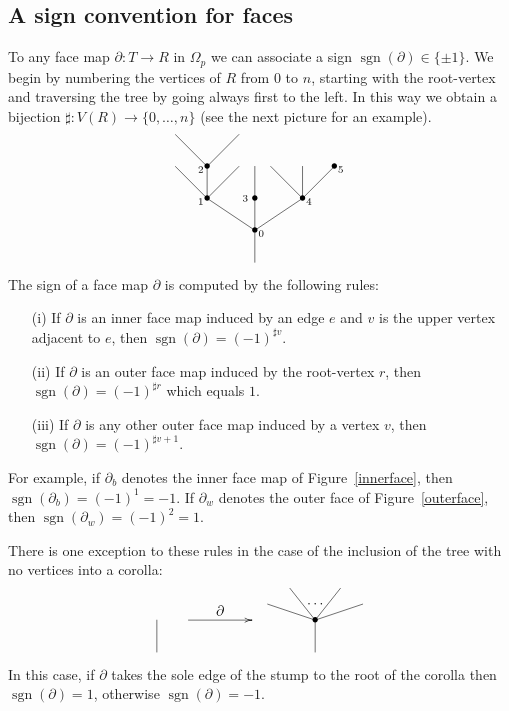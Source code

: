 \documentclass[a4paper]{amsart}
\theoremstyle{plain}
\theoremstyle{definition}
\theoremstyle{remark}
\DeclareMathOperator{\sgn}{sgn}
\newcommand{\rpd}{\Omega_p}
\newcommand{\To}{\longrightarrow}
\numberwithin{equation}{section}
\numberwithin{figure}{section}
\begin{document}
\subsection{A sign convention for faces}
To any face map  $\partial: T\To R$ in $\rpd$ we can associate a sign $\sgn(\partial)\in \{\pm 1\}$. We begin by
numbering the vertices of $R$ from $0$ to $n$, starting with the root-vertex and
traversing the tree by going always first to the left. In this way we obtain a bijection $\sharp:V(R)\To \{0,\ldots,n\}$
(see the next picture for an example).
$$
\xy<0.08cm,0cm>:
(25,0)*{}="1";
(25,10)*=0{\bullet}="2";
(10,20)*=0{\bullet}="3";
(25,20)*=0{\bullet}="4";
(40,20)*=0{\bullet}="5";
(0,30)*=0{}="6";
(10,30)*=0{\bullet}="7";
(20,30)*=0{}="8";
(25,30)*=0{}="9";
(30,30)*=0{}="10";
(40,30)*=0{}="11";
(50,30)*=0{\bullet}="12";
(0,40)*{}="13";
(20,40)*{}="14";
(27,9)*{\scriptstyle 0};
(8,19)*{\scriptstyle 1};
(8,29)*{\scriptstyle 2};
(22,20)*{\scriptstyle 3};
(42,19)*{\scriptstyle 4};
(52,29)*{\scriptstyle 5};
"1";"2" **\dir{-};
"2";"3" **\dir{-};
"2";"4" **\dir{-};
"2";"5" **\dir{-};
"3";"6" **\dir{-};
"3";"7" **\dir{-};
"3";"8" **\dir{-};
"4";"9" **\dir{-};
"5";"10" **\dir{-};
"5";"11" **\dir{-};
"5";"12" **\dir{-};
"7";"13" **\dir{-};
"7";"14" **\dir{-};
\endxy
$$
The sign of a face map $\partial$ is computed by the following rules:
\begin{itemize}
\item[{\rm (i)}] If $\partial$ is an inner face map induced by an edge $e$ and $v$ is the upper vertex adjacent to $e$, then
$\sgn(\partial)=(-1)^{\sharp v}$.
\item[{\rm (ii)}] If $\partial$ is an outer face map induced by the root-vertex $r$, then $\sgn(\partial)=(-1)^{\sharp r}$ which equals $1$.
\item[{\rm (iii)}] If $\partial$ is any other outer face map induced by a vertex $v$, then $\sgn(\partial)=(-1)^{\sharp v+1}$.
\end{itemize}

For example, if $\partial_b$ denotes the inner face map of Figure~\ref{innerface}, then $\sgn(\partial_b)=(-1)^1=-1$. If
$\partial_w$ denotes the outer face of Figure~\ref{outerface}, then $\sgn(\partial_w)=(-1)^2=1$.

There is one exception to these rules in the case of the inclusion of
the tree with no vertices into a corolla:
$$
\xy<0.08cm,0cm>:
(0,0)*{}="1";
(0,10)*=0{}="2";
(50,0)*=0{}="3";
(50,10)*=0{\bullet}="4";
(35,15)*=0{}="5";
(42,20)*{}="6";
(58,20)*{}="7";
(65,15)*=0{}="8";
(20,13)*{\partial};
"1";"2" **\dir{-};
"3";"4" **\dir{-};
"4";"5" **\dir{-};
"4";"6" **\dir{-};
"4";"7" **\dir{-};
"4";"8" **\dir{-};
{\ar(10, 10)*{};(30,10)*{}};
(50,15)*{\cdots};
\endxy
$$
In this case, if $\partial$ takes the sole edge of the stump to the root of the corolla then $\sgn(\partial)=1$, otherwise
$\sgn(\partial)=-1$.
\end{document}
